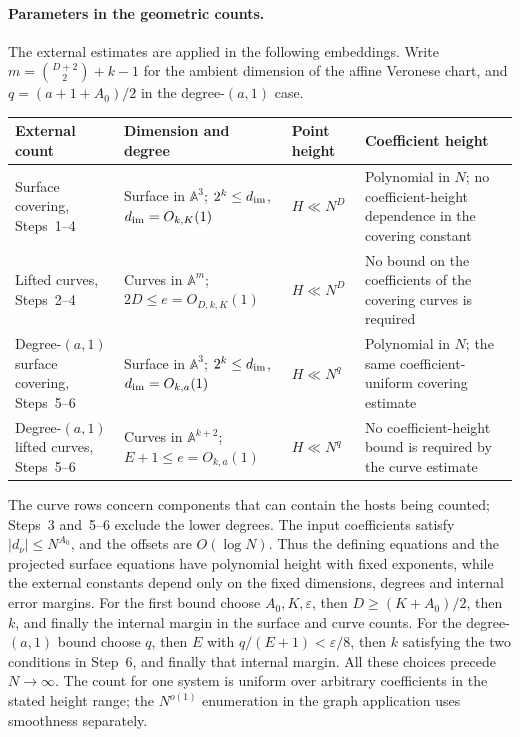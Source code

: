 \paragraph{Parameters in the geometric counts.}
The external estimates are applied in the following embeddings.  Write
$m=\binom{D+2}{2}+k-1$ for the ambient dimension of the affine Veronese chart,
and $q=(a+1+A_0)/2$ in the degree-$(a,1)$ case.
\begin{center}
\small
\begin{tabularx}{\textwidth}{@{}>{\raggedright\arraybackslash}p{}>{\raggedright\arraybackslash}p{}>{\raggedright\arraybackslash}p{}>{\raggedright\arraybackslash}X@{}}
\toprule
External count & Dimension and degree & Point height & Coefficient height\\
\midrule
Surface covering, Steps~1--4
& Surface in $\mathbb A^3$; $2^k\leq d_{\rm im}$,
$d_{\rm im}=O_{k,K}(1)$
& $H\ll N^D$
& Polynomial in $N$; no coefficient-height dependence in the covering constant\\
Lifted curves, Steps~2--4
& Curves in $\mathbb A^m$; $2D\leq e=O_{D,k,K}(1)$
& $H\ll N^D$
& No bound on the coefficients of the covering curves is required\\
Degree-$(a,1)$ surface covering, Steps~5--6
& Surface in $\mathbb A^3$; $2^k\leq d_{\rm im}$,
$d_{\rm im}=O_{k,a}(1)$
& $H\ll N^q$
& Polynomial in $N$; the same coefficient-uniform covering estimate\\
Degree-$(a,1)$ lifted curves, Steps~5--6
& Curves in $\mathbb A^{k+2}$; $E+1\leq e=O_{k,a}(1)$
& $H\ll N^q$
& No coefficient-height bound is required by the curve estimate\\
\bottomrule
\end{tabularx}
\end{center}
The curve rows concern components that can contain the hosts being counted;
Steps~3 and~5--6 exclude the lower degrees.  The input coefficients satisfy
$|d_\nu|\leq N^{A_0}$, and the offsets are $O(\log N)$.
Thus the defining equations and the projected surface equations have
polynomial height with fixed exponents, while the external constants depend
only on the fixed dimensions, degrees and internal error margins.
For the first bound choose $A_0,K,\varepsilon$, then
$D\geq(K+A_0)/2$, then $k$, and finally the internal margin in the
surface and curve counts.  For the degree-$(a,1)$ bound choose $q$, then
$E$ with $q/(E+1)<\varepsilon/8$, then $k$ satisfying the two conditions
in Step~6, and finally that internal margin.  All these choices precede
$N\to\infty$.  The count for one system is uniform over arbitrary
coefficients in the stated height range; the $N^{o(1)}$ enumeration in
the graph application uses smoothness separately.

